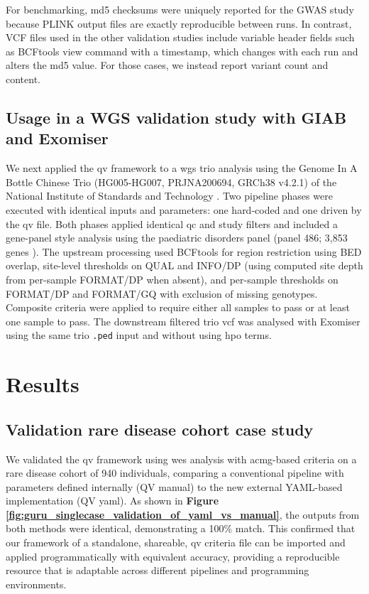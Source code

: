 For benchmarking, \ac{md5} checksums were uniquely reported for the GWAS study because PLINK output files are exactly reproducible between runs. In contrast, VCF files used in the other validation studies include variable header fields such as BCFtools view command with a timestamp, which changes with each run and alters the \ac{md5} value. For those cases, we instead report variant count and content.

\subsection{Usage in a WGS validation study with GIAB and Exomiser}
We next applied the \ac{qv} framework to a \ac{wgs} trio analysis using the Genome In A Bottle Chinese Trio (HG005-HG007, PRJNA200694, GRCh38 v4.2.1) of the National Institute of Standards and Technology \cite{2022wagnerBenchmarkingChallengingSmall}. 
Two pipeline phases were executed with identical inputs and parameters: one hard-coded and one driven by the \ac{qv} file.
Both phases applied identical \ac{qc} and study filters and included a gene-panel style analysis using the paediatric disorders panel (panel 486; 3{,}853 genes \cite{lawless_panelapprex_2025}). 
The upstream processing used BCFtools for region restriction using BED overlap, site-level thresholds on QUAL and INFO/DP (using computed site depth from per-sample FORMAT/DP when absent), and per-sample thresholds on FORMAT/DP and FORMAT/GQ with exclusion of missing genotypes. 
Composite criteria were applied to require either all samples to pass or at least one sample to pass. 
The downstream filtered trio \ac{vcf} was analysed with Exomiser using the same trio \texttt{.ped} input and without using \ac{hpo} terms.

\section{Results}
\subsection{Validation rare disease cohort case study}
We validated the \ac{qv} framework using \ac{wes} analysis with \ac{acmg}-based criteria on a rare disease cohort of 940 individuals, comparing a conventional pipeline with parameters defined internally (QV manual) to the new external YAML-based implementation (QV yaml).
As shown in \textbf{Figure \ref{fig:guru_singlecase_validation_of_yaml_vs_manual}}, 
the outputs from both methods were identical, demonstrating a 100\% match. This confirmed that our framework of a standalone, shareable, \ac{qv} criteria file can be imported and applied programmatically with equivalent accuracy, providing a reproducible resource that is adaptable across different pipelines and programming environments.


